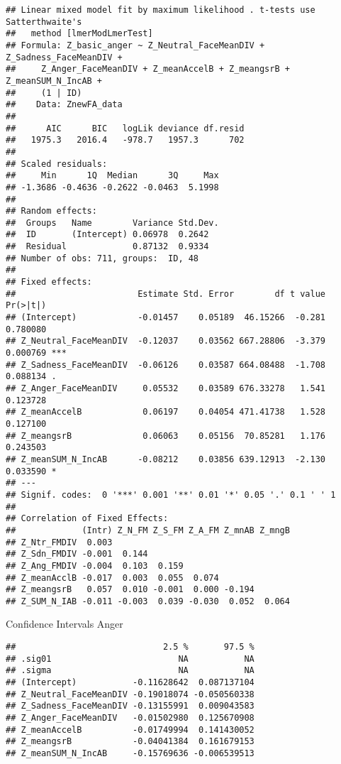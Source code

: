 \documentclass[
]{article}
\begin{document}
\begin{verbatim}
## Linear mixed model fit by maximum likelihood . t-tests use Satterthwaite's
##   method [lmerModLmerTest]
## Formula: Z_basic_anger ~ Z_Neutral_FaceMeanDIV + Z_Sadness_FaceMeanDIV +  
##     Z_Anger_FaceMeanDIV + Z_meanAccelB + Z_meangsrB + Z_meanSUM_N_IncAB +  
##     (1 | ID)
##    Data: ZnewFA_data
## 
##      AIC      BIC   logLik deviance df.resid 
##   1975.3   2016.4   -978.7   1957.3      702 
## 
## Scaled residuals: 
##     Min      1Q  Median      3Q     Max 
## -1.3686 -0.4636 -0.2622 -0.0463  5.1998 
## 
## Random effects:
##  Groups   Name        Variance Std.Dev.
##  ID       (Intercept) 0.06978  0.2642  
##  Residual             0.87132  0.9334  
## Number of obs: 711, groups:  ID, 48
## 
## Fixed effects:
##                        Estimate Std. Error        df t value Pr(>|t|)    
## (Intercept)            -0.01457    0.05189  46.15266  -0.281 0.780080    
## Z_Neutral_FaceMeanDIV  -0.12037    0.03562 667.28806  -3.379 0.000769 ***
## Z_Sadness_FaceMeanDIV  -0.06126    0.03587 664.08488  -1.708 0.088134 .  
## Z_Anger_FaceMeanDIV     0.05532    0.03589 676.33278   1.541 0.123728    
## Z_meanAccelB            0.06197    0.04054 471.41738   1.528 0.127100    
## Z_meangsrB              0.06063    0.05156  70.85281   1.176 0.243503    
## Z_meanSUM_N_IncAB      -0.08212    0.03856 639.12913  -2.130 0.033590 *  
## ---
## Signif. codes:  0 '***' 0.001 '**' 0.01 '*' 0.05 '.' 0.1 ' ' 1
## 
## Correlation of Fixed Effects:
##             (Intr) Z_N_FM Z_S_FM Z_A_FM Z_mnAB Z_mngB
## Z_Ntr_FMDIV  0.003                                   
## Z_Sdn_FMDIV -0.001  0.144                            
## Z_Ang_FMDIV -0.004  0.103  0.159                     
## Z_meanAcclB -0.017  0.003  0.055  0.074              
## Z_meangsrB   0.057  0.010 -0.001  0.000 -0.194       
## Z_SUM_N_IAB -0.011 -0.003  0.039 -0.030  0.052  0.064
\end{verbatim}

Confidence Intervals Anger

\begin{verbatim}
##                             2.5 %       97.5 %
## .sig01                         NA           NA
## .sigma                         NA           NA
## (Intercept)           -0.11628642  0.087137104
## Z_Neutral_FaceMeanDIV -0.19018074 -0.050560338
## Z_Sadness_FaceMeanDIV -0.13155991  0.009043583
## Z_Anger_FaceMeanDIV   -0.01502980  0.125670908
## Z_meanAccelB          -0.01749994  0.141430052
## Z_meangsrB            -0.04041384  0.161679153
## Z_meanSUM_N_IncAB     -0.15769636 -0.006539513
\end{verbatim}
\end{document}
